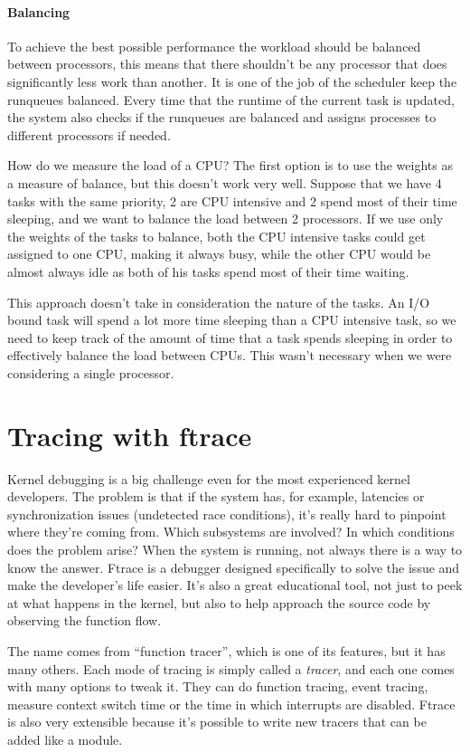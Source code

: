 \documentclass[10pt, oneside]{book}
\begin{document}
\subsubsection{Balancing}

To achieve the best possible performance the workload should be balanced between processors, this means that there shouldn't be any processor that does significantly less work than another. It is one of the job of the scheduler keep the runqueues balanced. Every time that the runtime of the current task is updated, the system also checks if the runqueues are balanced and assigns processes to different processors if needed. 

How do we measure the load of a CPU? The first option is to use the weights as a measure of balance, but this doesn't work very well. Suppose that we have 4 tasks with the same priority, 2 are CPU intensive and 2 spend most of their time sleeping, and we want to balance the load between 2 processors. If we use only the weights of the tasks to balance, both the CPU intensive tasks could get assigned to one CPU, making it always busy, while the other CPU would be almost always idle as both of his tasks spend most of their time waiting.

This approach doesn't take in consideration the nature of the tasks. An I/O bound task will spend a lot more time sleeping than a CPU intensive task, so we need to keep track of the amount of time that a task spends sleeping in order to effectively balance the load between CPUs. This wasn't necessary when we were considering a single processor. 


\chapter{Tracing with ftrace} 
\label{chap:ftrace}
Kernel debugging is a big challenge even for the most experienced kernel developers. The problem is that if the system has, for example, latencies or synchronization issues (undetected race conditions), it's really hard to pinpoint where they're coming from. Which subsystems are involved? In which conditions does the problem arise? When the system is running, not always there is a way to know the answer. Ftrace is a debugger designed specifically to solve the issue and make the developer's life easier. It's also a great educational tool, not just to peek at what happens in the kernel, but also to help approach the source code by observing the function flow.

The name comes from ``function tracer'', which is one of its features, but it has many others. Each mode of tracing is simply called a \textit{tracer}, and each one comes with many options to tweak it. They can do function tracing, event tracing, measure context switch time or the time in which interrupts are disabled. Ftrace is also very extensible because it's possible to write new tracers that can be added like a module.
\end{document}
